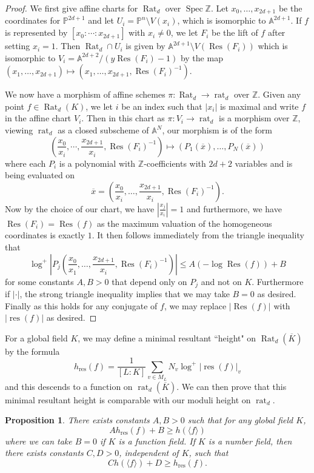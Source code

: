 \documentclass[10pt]{amsart}
\newcommand{\bb}{\mathbb}
\newcommand{\Res}{\operatorname{Res}}
\newcommand{\res}{\operatorname{res}}
\newcommand{\ovl}{\overline}
\newcommand{\Spec}{\operatorname{Spec}}
\newcommand{\Rat}{\operatorname{Rat}}
\newcommand{\rat}{\operatorname{rat}}
\numberwithin{theorem}{section}
\newtheorem{proposition}[theorem]{Proposition}
\numberwithin{example}{section}
\numberwithin{definition}{section}
\begin{document}
\begin{proof}
We first give affine charts for $\Rat_d$ over $\Spec \bb{Z}$. Let $x_0,\ldots,x_{2d+1}$ be the coordinates for $\bb{P}^{2d+1}$ and let $U_i = \bb{P}^n \setminus V(x_i)$, which is isomorphic to $\bb{A}^{2d+1}$. If $f$ is represented by $[x_0: \cdots : x_{2d+1}]$ with $x_i \not = 0$, we let $F_i$ be the lift of $f$ after setting $x_i = 1$. Then $\Rat_d \cap U_i$ is given by $\bb{A}^{2d+1} \setminus V(\Res(F_i))$ which is isomorphic to $V_i = \bb{A}^{2d+2}/(y \Res(F_i) - 1)$ by the map $(x_1,\ldots,x_{2d+1}) \mapsto (x_1,\ldots,x_{2d+1}, \Res(F_i)^{-1})$.
\par 
We now have a morphism of affine schemes $\pi: \Rat_d \to \rat_d$ over $\bb{Z}$. Given any point $f \in \Rat_d(K)$, we let $i$ be an index such that $|x_i|$ is maximal and write $f$ in the affine chart $V_i$. Then in this chart as $\pi: V_i \to \rat_d$ is a morphism over $\bb{Z}$, viewing $\rat_d$ as a closed subscheme of $\bb{A}^N$, our morphism is of the form
$$\left(\frac{x_0}{x_i}, \cdots, \frac{x_{2d+1}}{x_i}, \Res(F_i)^{-1} \right) \mapsto (P_1(\ovl{x}),\ldots,P_N(\ovl{x})) $$
where each $P_i$ is a polynomial with $\bb{Z}$-coefficients with $2d+2$ variables and is being evaluated on 
$$\ovl{x} = \left( \frac{x_0}{x_i},\ldots,\frac{x_{2d+1}}{x_i}, \Res(F_i)^{-1} \right).$$ 
Now by the choice of our chart, we have $|\frac{x_j}{x_i}| = 1$ and furthermore, we have $\Res(F_i) = \Res(f)$ as the maximum valuation of the homogeneous coordinates is exactly $1$. It then follows immediately from the triangle inequality that 
$$\log^+ \left|P_j \left(\frac{x_0}{x_1},\ldots,\frac{x_{2d+1}}{x_i},\Res(F_i)^{-1} \right) \right| \leq A(-\log \Res(f)) + B$$
for some constants $A,B > 0$ that depend only on $P_j$ and not on $K$. Furthermore if $| \cdot |$, the strong triangle inequality implies that we may take $B = 0$ as desired. Finally as this holds for any conjugate of $f$, we may replace $|\Res(f)|$ with $|\res(f)|$ as desired. 
\end{proof}

For a global field $K$, we may define a minimal resultant ``height" on $\Rat_d(\ovl{K})$ by the formula 
$$h_{\res}(f) = \frac{1}{[L:K]}\sum_{v \in M_L} N_v \log^+|\res(f)|_v$$
and this descends to a function on $\rat_d(\ovl{K})$. We can then prove that this minimal resultant height is comparable with our moduli height on $\rat_d$. 

\begin{proposition} \label{GlobalResComparison1}
There exists constants $A,B > 0$ such that for any global field $K$,
$$A h_{\res}(f) + B \geq h(\langle f \rangle)$$
where we can take $B = 0$ if $K$ is a function field. If $K$ is a number field, then there exists constants $C,D > 0$, independent of $K$, such that 
$$C h(\langle f \rangle) + D \geq h_{\res}(f).$$
\end{proposition}
\end{document}
